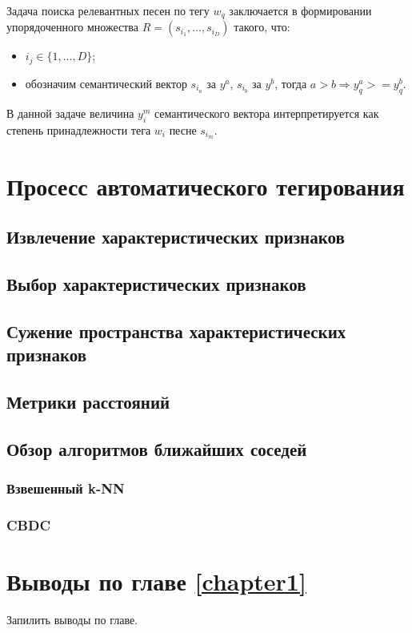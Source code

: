 Задача поиска релевантных песен по тегу $w_q$ заключается в формировании упорядоченного множества $R = (s_{i_1}, \ldots, s_{i_D})$ такого, что:
\begin{itemize}
 \item $i_j \in \{1, \ldots, D \}$;
 \item обозначим семантический вектор $s_{i_a}$ за $y^a$, $s_{i_b}$ \ld за $y^b$, тогда $a > b \Rightarrow y^a_q >= y^b_q $.
\end{itemize}
В данной задаче величина $y^m_i$ семантического вектора интерпретируется как степень принадлежности тега $w_i$ песне $s_{i_m}$. 
 
\section{Просесс автоматического тегирования}

\subsection{Извлечение характеристических признаков}
\subsection{Выбор характеристических признаков}
\subsection{Сужение пространства характеристических признаков}
\subsection{Метрики расстояний}
\subsection{Обзор алгоритмов ближайших соседей}
\subsubsection{Взвешенный k-NN}
\subsubsection{CBDC}

\section{Выводы по главе \ref{chapter1}}
Запилить выводы по главе.





